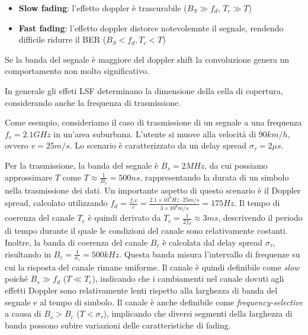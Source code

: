 \begin{itemize}
    \item \textbf{Slow fading}: l'effetto doppler è trascurabile ($B_S \gg f_d$, $T_c \gg T$)
    \item \textbf{Fast fading}: l'effetto doppler distorce notevolemnte il segnale, rendendo difficile ridurre il BER ($B_S < f_d, T_c < T$)
\end{itemize}
Se la banda del segnale è maggiore del doppler shift la convoluzione genera un comportamento non molto significativo.

In generale gli effeti LSF determinano la dimensione della cella di copertura, considerando anche la frequenza di trasmissione.


Come esempio, consideriamo il caso di trasmissione di un segnale a una frequenza \( f_c = 2.1 \si{GHz} \) in un'area suburbana. L'utente si muove alla velocità di $90 \si{km/h}$, ovvero \( v = 25 \si{m/s} \). Lo scenario è caratterizzato da un delay spread \( \sigma_\tau = 2 \si{\mu s} \).

Per la trasmissione, la banda del segnale è \( B_s = 2 \si{MHz} \), da cui possiamo approssimare \( T \) come \( T \approx \frac{1}{B_s} = 500 \si{ns} \), rappresentando la durata di un simbolo nella trasmissione dei dati.
Un importante aspetto di questo scenario è il Doppler spread, calcolato utilizzando \( f_d = \frac{f_c v}{c} = \frac{2.1 \times 10 ^9 \si{Hz} \cdot 25 \si{m/s}}{3 \times 10^8 \si{m/s}} = 175\si{Hz}\).
Il tempo di coerenza del canale \( T_c \) è quindi derivato da \( T_c = \frac{1}{2f_d} \approx 3 \si{ms}\), descrivendo il periodo di tempo durante il quale le condizioni del canale sono relativamente costanti.
Inoltre, la banda di coerenza del canale \( B_c \) è calcolata dal delay spread \( \sigma_\tau \), risultando in \( B_c = \frac{1}{\sigma_\tau} = 500 \si{kHz} \). Questa banda misura l'intervallo di frequenze su cui la risposta del canale rimane uniforme.
Il canale è quindi definibile come \textit{slow} poiché \( B_s \gg f_d \) (\( T \ll T_c \)), indicando che i cambiamenti nel canale dovuti agli effetti Doppler sono relativamente lenti rispetto alla larghezza di banda del segnale e al tempo di simbolo.
Il canale è anche definibile come \textit{frequency-selective} a causa di \( B_s > B_c \) (\( T < \sigma_\tau \)), implicando che diversi segmenti della larghezza di banda possono subire variazioni delle caratteristiche di fading.













